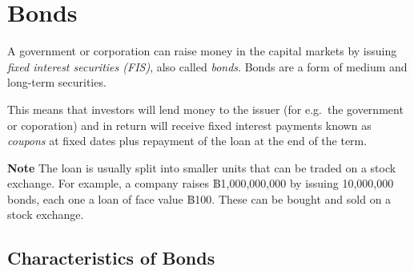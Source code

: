 \documentclass[
]{book}
\theoremstyle{definition}
\theoremstyle{definition}
\theoremstyle{definition}
\theoremstyle{definition}
\theoremstyle{remark}
\begin{document}
\section{Bonds}\label{bonds}

A government or corporation can raise money in the capital markets by
issuing \emph{fixed interest securities (FIS)}, also called \emph{bonds}. Bonds
are a form of medium and long-term securities.

This means that investors will lend money to the issuer (for e.g.~the
government or coporation) and in return will receive fixed interest
payments known as \emph{coupons} at fixed dates plus repayment of the loan at
the end of the term.

\textbf{Note} The loan is usually split into smaller units that can be traded
on a stock exchange. For example, a company raises ฿1,000,000,000 by
issuing 10,000,000 bonds, each one a loan of face value ฿100. These can
be bought and sold on a stock exchange.

\subsection{Characteristics of Bonds}\label{characteristics-of-bonds}
\end{document}
